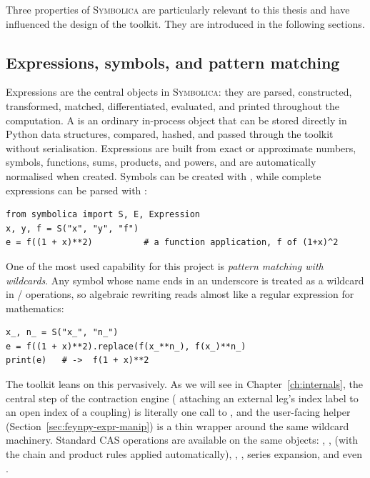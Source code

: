 Three properties of \textsc{Symbolica} are particularly relevant to this thesis and have influenced the design of the toolkit. They are introduced in the following sections.

\subsection*{Expressions, symbols, and pattern matching}

Expressions are the central objects in \textsc{Symbolica}: they are parsed, constructed, transformed, matched, differentiated, evaluated, and printed throughout the computation. A  is an ordinary in-process object that can be stored directly in Python data structures, compared, hashed, and passed through the toolkit without serialisation. Expressions are built from exact or approximate numbers, symbols, functions, sums, products, and powers, and are automatically normalised when created. Symbols can be created with , while complete expressions can be parsed with :



\begin{verbatim}
from symbolica import S, E, Expression
x, y, f = S("x", "y", "f")
e = f((1 + x)**2)          # a function application, f of (1+x)^2
\end{verbatim}

One of the most used capability for this project is \emph{pattern matching with wildcards}. Any symbol whose name ends in an underscore is treated as a wildcard in / operations, so algebraic rewriting reads almost like a regular expression for mathematics:

\begin{verbatim}
x_, n_ = S("x_", "n_")
e = f((1 + x)**2).replace(f(x_**n_), f(x_)**n_)
print(e)   # ->  f(1 + x)**2
\end{verbatim}

The toolkit leans on this pervasively. As we will see in Chapter~\ref{ch:internals}, the central step of the contraction engine ( attaching an external leg's index label to an open index of a coupling) is literally one call to
, and the user-facing helper  (Section~\ref{sec:feynpy-expr-manip}) is a thin wrapper around the same wildcard machinery. Standard CAS operations are available on the same objects: , ,  (with the chain and product rules applied automatically), , , series expansion, and even .

